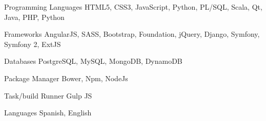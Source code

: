 


\begin{cvskills}


\cvskill
{Programming Languages} %
{HTML5, CSS3, JavaScript, Python, PL/SQL, Scala, Qt, Java, PHP, Python} %


\cvskill
{Frameworks} %
{AngularJS, SASS, Bootstrap, Foundation, jQuery, Django, Symfony, Symfony 2, ExtJS} %


\cvskill
{Databases} %
{PostgreSQL, MySQL, MongoDB, DynamoDB} %


\cvskill
{Package Manager} %
{Bower, Npm, NodeJs} %


\cvskill
{Task/build Runner } %
{Gulp JS} %


\cvskill
{Languages} %
{Spanish, English} %




\end{cvskills}

